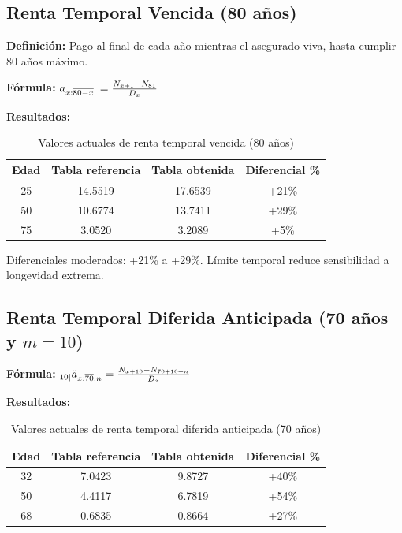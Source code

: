 \subsection{Renta Temporal Vencida (80 años)}

\textbf{Definición:} Pago al final de cada año mientras el asegurado viva, hasta cumplir 80 años máximo.

\textbf{Fórmula:} $a_{x:\overline{80-x}|} = \frac{N_{x+1} - N_{81}}{D_{x}}$

\textbf{Resultados:}

\begin{table}[H]
\centering
\caption{Valores actuales de renta temporal vencida (80 años)}
\label{tab:renta_temporal_80}
\begin{tabular}{cccc}
\toprule
\tableheadercolor
\textbf{Edad} & \textbf{Tabla referencia} & \textbf{Tabla obtenida} & \textbf{Diferencial \%} \\
\midrule
25 & 14.5519 & 17.6539 & +21\% \\
50 & 10.6774 & 13.7411 & +29\% \\
75 & 3.0520 & 3.2089 & +5\% \\
\bottomrule
\end{tabular}
\end{table}

Diferenciales moderados: +21\% a +29\%. Límite temporal reduce sensibilidad a longevidad extrema.

\subsection{Renta Temporal Diferida Anticipada (70 años y $m=10$)}

\textbf{Fórmula:} ${}_{10\mid}\ddot{a}_{x:\overline{70}:n} = \frac{N_{x+10} - N_{70+10+n}}{D_{x}}$

\textbf{Resultados:}

\begin{table}[H]
\centering
\caption{Valores actuales de renta temporal diferida anticipada (70 años)}
\label{tab:renta_temporal_diferida_70}
\begin{tabular}{cccc}
\toprule
\tableheadercolor
\textbf{Edad} & \textbf{Tabla referencia} & \textbf{Tabla obtenida} & \textbf{Diferencial \%} \\
\midrule
32 & 7.0423 & 9.8727 & +40\% \\
50 & 4.4117 & 6.7819 & +54\% \\
68 & 0.6835 & 0.8664 & +27\% \\
\bottomrule
\end{tabular}
\end{table}

